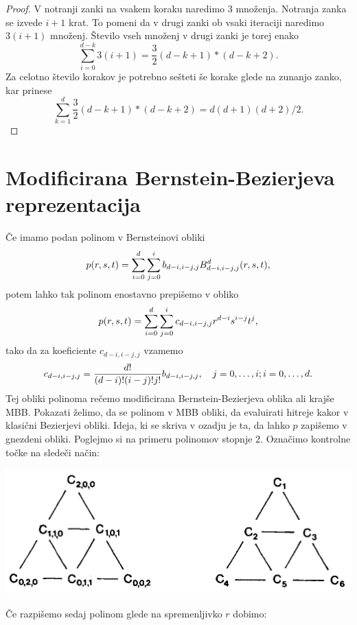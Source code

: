 \documentclass{article}
\begin{document}
\begin{proof}
V notranji zanki na vsakem koraku naredimo $3$ množenja. Notranja zanka se izvede $i+1$ krat. To pomeni da v drugi zanki ob vsaki iteraciji naredimo $3(i+1)$ množenj. Število vseh množenj v drugi zanki je torej enako
$$\sum_{i=0}^{d-k}3(i+1) = \frac{3}{2}(d-k+1)*(d-k+2).$$
Za celotno število korakov je potrebno sešteti še korake glede na zunanjo zanko, kar prinese 
$$\sum_{k=1}^{d}\frac{3}{2}(d-k+1)*(d-k+2) = d(d+1)(d+2)/2.$$
\end{proof}


\section{Modificirana Bernstein-Bezierjeva reprezentacija}

Če imamo podan polinom v Bernsteinovi obliki $$p(r,\\s,\\t) = \sum_{i=0}^{d}\sum_{j=0}^{i}b_{d-i,i-j,j}B_{d-i,i-j,j}^d(r,\\s,\\t),$$
potem lahko tak polinom enostavno prepišemo v obliko
$$p(r,\\s,\\t) = \sum_{i=0}^{d}\sum_{j=0}^{i}c_{d-i,i-j,j}r^{d-i}s^{i-j}t^j,$$
tako da za koeficiente $c_{d-i,i-j,j}$ vzamemo
$$c_{d-i,i-j,j} = \frac{d!}{(d-i)!(i-j)!j!}b_{d-i,i-j,j}, \quad j=0,\ldots, i;\\ i = 0,\ldots,d.$$
Tej obliki polinoma rečemo modificirana Bernstein-Bezierjeva oblika ali krajše MBB. Pokazati želimo, da se polinom v MBB obliki, da evaluirati hitreje kakor v klasični Bezierjevi obliki. Ideja, ki se skriva v ozadju je ta, da lahko $p$ zapišemo v gnezdeni obliki. Poglejmo si na primeru polinomov stopnje $2$. Označimo kontrolne točke na sledeči način:

\begin{center}
\includegraphics[width=.9\linewidth]{graf.png}
\end{center}

Če razpišemo sedaj polinom glede na spremenljivko $r$ dobimo:
\end{document}
